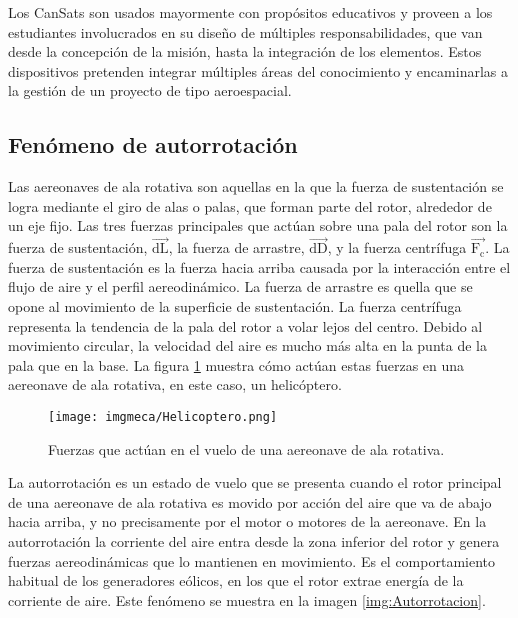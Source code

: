 \noindent Los CanSats son usados mayormente con prop\'ositos educativos y proveen a los estudiantes involucrados en su dise\~{n}o de m\'ultiples responsabilidades, que van desde la concepci\'on de la misi\'on, hasta la integraci\'on de los elementos. Estos dispositivos pretenden integrar m\'ultiples \'areas del conocimiento y encaminarlas a la gesti\'on de un proyecto de tipo aeroespacial.

		\subsection{Fen\'omeno de autorrotaci\'on} \label{subsec:autorot}
Las aereonaves de ala rotativa son aquellas en la que la fuerza de sustentaci\'on se logra mediante el giro de alas o palas, que forman parte del rotor, alrededor de un eje fijo. Las tres fuerzas principales que act\'uan sobre una pala del rotor son la fuerza de sustentaci\'on, $\overrightarrow{\text{dL}}$, la fuerza de arrastre, $\overrightarrow{\text{dD}}$, y la fuerza centr\'ifuga $\overrightarrow{\text{F}_\text{c}}$. La fuerza de sustentaci\'on es la fuerza hacia arriba causada por la interacci\'on entre el flujo de aire y el perfil aereodin\'amico. La fuerza de arrastre es quella que se opone al movimiento de la superficie de sustentaci\'on. La fuerza centr\'ifuga representa la tendencia de la pala del rotor a volar lejos del centro. Debido al movimiento circular, la velocidad del aire es mucho m\'as alta en la punta de la pala que en la base. La figura \ref{img:Helicoptero} muestra c\'omo act\'uan estas fuerzas en una aereonave de ala rotativa, en este caso, un helic\'optero.

\begin{figure}[H]
	\centering
		\texttt{[image: imgmeca/Helicoptero.png]}
	\caption{Fuerzas que act\'uan en el vuelo de una aereonave de ala rotativa.}
	\label{img:Helicoptero}
\end{figure}

\noindent La autorrotaci\'on  es un estado de vuelo que se presenta cuando el rotor principal de una aereonave de ala rotativa es movido por acci\'on del aire que va de abajo hacia arriba, y no precisamente por el motor o motores de la aereonave. En la autorrotaci\'on la corriente del aire entra desde la zona inferior del rotor y genera fuerzas aereodin\'amicas que lo mantienen en movimiento. Es el comportamiento habitual de los generadores e\'olicos, en los que el rotor extrae energ\'ia de la corriente de aire. Este fen\'omeno se muestra en la imagen \ref{img:Autorrotacion}.


